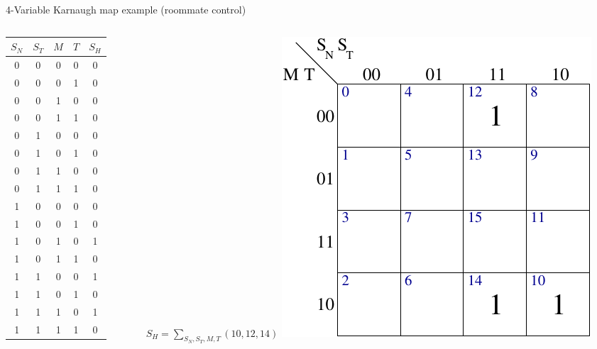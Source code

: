 \begin{frame}{4-Variable Karnaugh map example (roommate control)}
  \begin{columns}
    \begin{column}{5cm}
      \begin{center}
        \begin{tabular}{cccc|c}
          \textbf{$S_N$} & \textbf{$S_T$} & \textbf{$M$} & \textbf{$T$} & \textbf{$S_H$} \\
          \hline
          0 & 0 & 0 & 0 & 0 \\[-0.5ex]
          0 & 0 & 0 & 1 & 0 \\[-0.5ex]
          0 & 0 & 1 & 0 & 0 \\[-0.5ex]
          0 & 0 & 1 & 1 & 0 \\[-0.5ex]
          0 & 1 & 0 & 0 & 0 \\[-0.5ex]
          0 & 1 & 0 & 1 & 0 \\[-0.5ex]
          0 & 1 & 1 & 0 & 0 \\[-0.5ex]
          0 & 1 & 1 & 1 & 0 \\[-0.5ex]
          1 & 0 & 0 & 0 & 0 \\[-0.5ex]
          1 & 0 & 0 & 1 & 0 \\[-0.5ex]
          1 & 0 & 1 & 0 & 1 \\[-0.5ex]
          1 & 0 & 1 & 1 & 0 \\[-0.5ex]
          1 & 1 & 0 & 0 & 1 \\[-0.5ex]
          1 & 1 & 0 & 1 & 0 \\[-0.5ex]
          1 & 1 & 1 & 0 & 1 \\[-0.5ex]
          1 & 1 & 1 & 1 & 0 \\[-0.5ex]
        \end{tabular}
      \end{center}
    \end{column}
    \begin{column}{5cm}
      \begin{center}
        $S_H = \sum_{S_N,S_T,M,T}(10,12,14)$
        \bigskip
        \includegraphics[scale=0.7]{4VariableRoommateControlKMap}

\end{center}
\end{column}
\end{columns}
\end{frame}
